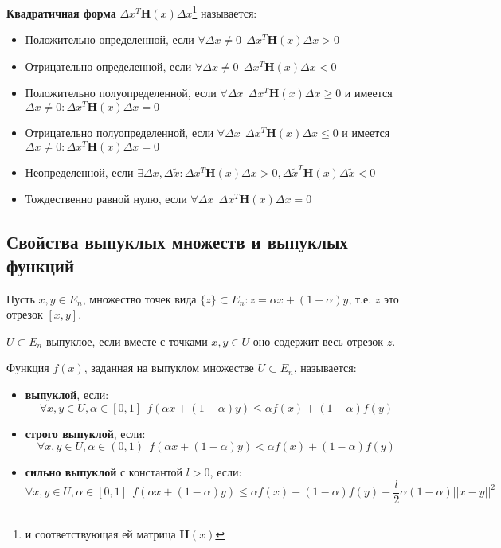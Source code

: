 \begin{definition}
    \textbf{Квадратичная форма} \(\Delta x^T \mathbf H(x) \Delta x\)\footnote{и соответствующая ей матрица \(\mathbf H(x)\)} называется:
    \begin{itemize}
        \item Положительно определенной, если \(\forall \Delta x \neq 0 \ \ \Delta x^T \mathbf H(x) \Delta x > 0\)
        \item Отрицательно определенной, если \(\forall \Delta x \neq 0 \ \ \Delta x^T \mathbf H(x) \Delta x < 0\)
        \item Положительно полуопределенной, если \(\forall \Delta x \ \ \Delta x^T \mathbf H(x) \Delta x \geq 0\) и имеется \(\Delta x \neq 0 : \Delta x^T \mathbf H(x) \Delta x = 0\)
        \item Отрицательно полуопределенной, если \(\forall \Delta x \ \ \Delta x^T \mathbf H(x) \Delta x \leq 0\) и имеется \(\Delta x \neq 0 : \Delta x^T \mathbf H(x) \Delta x = 0\)
        \item Неопределенной, если \(\exists \Delta x, \Delta \tilde x : \Delta x^T \mathbf H(x) \Delta x > 0, \Delta \tilde x^T \mathbf H(x) \Delta \tilde x < 0\)
        \item Тождественно равной нулю, если \(\forall \Delta x \ \ \Delta x^T \mathbf H(x) \Delta x = 0\)
    \end{itemize}
\end{definition}

\subsection{Свойства выпуклых множеств и выпуклых функций}

\begin{definition}
    Пусть \(x, y \in E_n\), множество точек вида \(\{z\} \subset E_n : z = \alpha x + (1 - \alpha) y\), т.е. \(z\) это отрезок \([x, y]\).
\end{definition}

\begin{definition}
    \(U \subset E_n\) выпуклое, если вместе с точками \(x, y \in U\) оно содержит весь отрезок \(z\).
\end{definition}

\begin{definition}
    Функция \(f(x)\), заданная на выпуклом множестве \(U \subset E_n\), называется:
    \begin{itemize}
        \item \textbf{выпуклой}, если:
              \[\forall x, y \in U, \alpha \in [0, 1] \ \ f(\alpha x + (1 - \alpha) y) \leq \alpha f(x) + (1 - \alpha) f(y)\]
        \item \textbf{строго выпуклой}, если:
              \[\forall x, y \in U, \alpha \in (0, 1) \ \ f(\alpha x + (1 - \alpha) y) < \alpha f(x) + (1 - \alpha) f(y)\]
        \item \textbf{сильно выпуклой} с константой \(l > 0\), если:
              \[\forall x, y \in U, \alpha \in [0, 1] \ \ f(\alpha x + (1 - \alpha) y) \leq \alpha f(x) + (1 - \alpha) f(y) - \frac{l}{2} \alpha (1 - \alpha) ||x - y||^2\]
    \end{itemize}
\end{definition}

